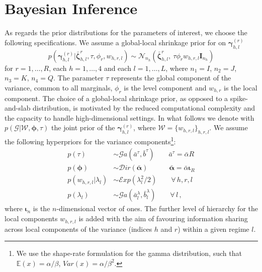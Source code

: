 \documentclass[12pt,a4paper]{article}
\theoremstyle{custom}
\begin{document}
\section{Bayesian Inference} \label{sec:inference}
As regards the prior distributions for the parameters of interest, we choose the following specifications. We assume a global-local shrinkage prior for on $\boldsymbol{\gamma}_{h,l}^{(r)}$
\begin{equation}
p(\boldsymbol{\gamma}_{h,l}^{(r)} | \bar{\boldsymbol{\zeta}}_{h,l}^r, \tau, \phi_r, w_{h,r,l}) \sim \mathcal{N}_{n_h}(\bar{\boldsymbol{\zeta}}_{h,l}^r, \: \tau \phi_r w_{h,r,l} \mathbf{I}_{n_h})
\label{eq:prior_gammas}
\end{equation}
for $r=1,\ldots,R$, each $h=1,\ldots,4$ and each $l=1,\ldots,L$, where $n_1= I$, $n_2=J$, $n_3=K$, $n_4=Q$. The parameter $\tau$ represents the global component of the variance, common to all marginals, $\phi_r$ is the level component and $w_{h,r}$ is the local component. 
The choice of a global-local shrinkage prior, as opposed to a spike-and-slab distribution, is motivated by the reduced computational complexity and the capacity to handle high-dimensional settings. In what follows we denote with $p(\mathcal{G}|\mathcal{W},\boldsymbol{\phi},\tau)$ the joint prior of the $\boldsymbol{\gamma}_{h,l}^{(r)}$, where $\mathcal{W} = \lbrace w_{h,r,l} \rbrace_{h,r,l}$.
We assume the following hyperpriors for the variance components\footnote{We use the shape-rate formulation for the gamma distribution, such that $\mathbb{E}(x) = \alpha/\beta$, $Var(x)=\alpha/\beta^2$.}:
\begin{align}
\label{eq:prior_tau}
p(\tau) & \sim \mathcal{G}a(\bar{a}^\tau, \bar{b}^\tau) \qquad \bar{a}^\tau = \bar{\alpha} R \\\label{eq:prior_phi}
p(\boldsymbol{\phi}) & \sim \mathcal{D}ir(\bar{\boldsymbol{\alpha}}) \quad \qquad \bar{\boldsymbol{\alpha}} = \bar{\alpha}\boldsymbol{\iota}_R \\
\label{eq:prior_w}
p(w_{h,r,l}|\lambda_l) & \sim \mathcal{E}xp(\lambda_l^2/2) \qquad \forall \, h,r,l \\
\label{eq:prior_lambda}
p(\lambda_l) & \sim \mathcal{G}a(\bar{a}_l^\lambda,\bar{b}_l^\lambda) \qquad \forall \, l \, ,
\end{align}
where $\boldsymbol{\iota}_n$ is the $n$-dimensional vector of ones. 
The further level of hierarchy for the local components $w_{h,r,l}$ is added with the aim of favouring information sharing across local components of the variance (indices $h$ and $r$) within a given regime $l$.
\end{document}
